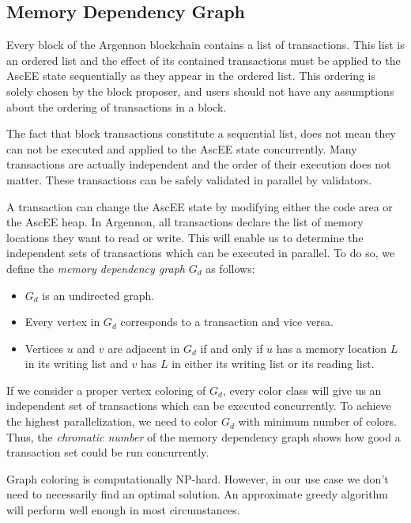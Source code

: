 

\subsection{Memory Dependency Graph}\label{subsec:memory-dependency-graph}

Every block of the Argennon blockchain contains a list of transactions. This list is an ordered list and the
effect of its contained transactions must be applied to the AscEE state sequentially as they appear in the ordered
list. This ordering is solely chosen by the block proposer, and users should not have any assumptions about
the ordering of transactions in a block.

The fact that block transactions constitute a sequential list, does not mean they can not be executed and applied
to the AscEE state concurrently. Many transactions are actually independent and the order of their execution does not
matter. These transactions can be safely validated in parallel by validators.

A transaction can change the AscEE state by modifying either the code area or the AscEE heap. In Argennon, all
transactions declare the list of memory locations they want to read or write. This will enable us to determine the
independent sets of transactions which can be executed in parallel. To do so, we define the \emph{memory dependency
graph} \(G_d\) as follows:

\begin{itemize}
    \item \(G_d\) is an undirected graph.
    \item Every vertex in \(G_d\) corresponds to a transaction and vice versa.
    \item Vertices \(u\) and \(v\) are adjacent in \(G_d\) if and only if \(u\) has a memory location \(L\) in its
    writing list and \(v\) has \(L\) in either its writing list or its reading list.
\end{itemize}

If we consider a proper vertex coloring of \(G_d\), every color class will give us an independent set of
transactions which can be executed concurrently. To achieve the highest parallelization, we need to color \(G_d\)
with minimum number of colors. Thus, the \emph{chromatic number} of the memory dependency graph shows how good a
transaction set could be run concurrently.

Graph coloring is computationally NP-hard. However, in our use case we don't need to necessarily find an optimal
solution. An approximate greedy algorithm will perform well enough in most circumstances.

